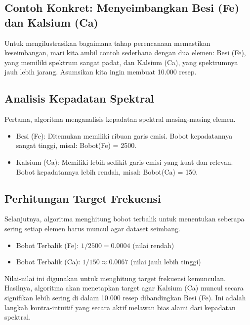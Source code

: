 \begin{onehalfspace}
\section*{Contoh Konkret: Menyeimbangkan Besi (Fe) dan Kalsium (Ca)}
Untuk mengilustrasikan bagaimana tahap perencanaan memastikan keseimbangan, mari kita ambil contoh sederhana dengan dua elemen: Besi (Fe), yang memiliki spektrum sangat padat, dan Kalsium (Ca), yang spektrumnya jauh lebih jarang. Asumsikan kita ingin membuat 10.000 resep.

\subsection*{Analisis Kepadatan Spektral}
Pertama, algoritma menganalisis kepadatan spektral masing-masing elemen.
\begin{itemize}
    \item Besi (Fe): Ditemukan memiliki ribuan garis emisi. Bobot kepadatannya sangat tinggi, misal: Bobot(Fe) = 2500.
    \item Kalsium (Ca): Memiliki lebih sedikit garis emisi yang kuat dan relevan. Bobot kepadatannya lebih rendah, misal: Bobot(Ca) = 150.
\end{itemize}

\subsection*{Perhitungan Target Frekuensi}
Selanjutnya, algoritma menghitung bobot terbalik untuk menentukan seberapa sering setiap elemen harus muncul agar dataset seimbang.
\begin{itemize}
    \item Bobot Terbalik (Fe): $1 / 2500 = 0.0004$ (nilai rendah)
    \item Bobot Terbalik (Ca): $1 / 150 \approx 0.0067$ (nilai jauh lebih tinggi)
\end{itemize}
Nilai-nilai ini digunakan untuk menghitung target frekuensi kemunculan. Hasilnya, algoritma akan menetapkan target agar Kalsium (Ca) muncul secara signifikan lebih sering di dalam 10.000 resep dibandingkan Besi (Fe). Ini adalah langkah kontra-intuitif yang secara aktif melawan bias alami dari kepadatan spektral.


\end{onehalfspace}
